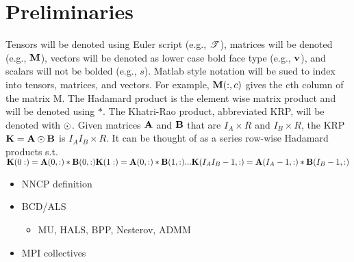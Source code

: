 
\section{Preliminaries} 
\label{sec:prelims}

	Tensors will be denoted using Euler script (e.g., $\T{T}$), matrices will be denoted (e.g., $\M{M}$), vectors will be denoted as lower case bold face type (e.g., $\V{v}$), and scalars will not be bolded (e.g., $s$). Matlab style notation will be sued to index into tensors, matrices, and vectors. For example, $\M{M}(:,c)$ gives the cth column of the matrix M.
	The Hadamard product is the element wise matrix product and will be denoted using $*$. 
	The Khatri-Rao product, abbreviated KRP, will be denoted with $\odot$. Given matrices $\M{A}$ and $\M{B}$ that are $I_{A} \times R$ and $I_{B} \times R$, the KRP $\M{K} = \M{A} \Khat \M{B}$ is $I_{A}I_{B} \times R$. It can be thought of as a series row-wise Hadamard products s.t. \\$\M{K}(0:) = \M{A}(0,:) * \M{B}(0,:)\\ \M{K}(1:) = \M{A}(0,:) * \M{B}(1,:)  \\.\\.\\. \\ \M{K}(I_{A}I_{B} - 1,:) = \M{A}(I_{A}-1,:) * \M{B}(I_{B}-1,:)$ 

\begin{itemize}
	\item NNCP definition
	\item BCD/ALS
	\begin{itemize}
		\item MU, HALS, BPP, Nesterov, ADMM
	\end{itemize}
	\item MPI collectives
\end{itemize}

